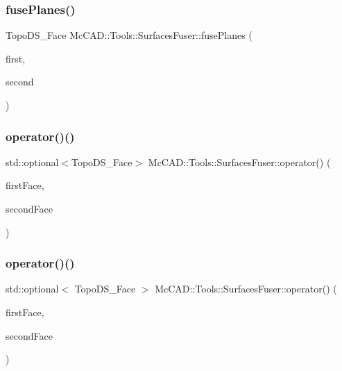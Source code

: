 \subsubsection{\texorpdfstring{fuse\+Planes()}{fusePlanes()}\hspace{0.1cm}{\footnotesize\ttfamily [2/2]}}
{\footnotesize\ttfamily Topo\+D\+S\+\_\+\+Face Mc\+C\+A\+D\+::\+Tools\+::\+Surfaces\+Fuser\+::fuse\+Planes (\begin{DoxyParamCaption}\item[{const Topo\+D\+S\+\_\+\+Face \&}]{first,  }\item[{const Topo\+D\+S\+\_\+\+Face \&}]{second }\end{DoxyParamCaption})\hspace{0.3cm}{\ttfamily [private]}}

\mbox{\label{classMcCAD_1_1Tools_1_1SurfacesFuser_a474383c6856eeb901ff8f947c8dca9ed}} 
\subsubsection{\texorpdfstring{operator()()}{operator()()}\hspace{0.1cm}{\footnotesize\ttfamily [1/2]}}
{\footnotesize\ttfamily std\+::optional$<$Topo\+D\+S\+\_\+\+Face$>$ Mc\+C\+A\+D\+::\+Tools\+::\+Surfaces\+Fuser\+::operator() (\begin{DoxyParamCaption}\item[{const Topo\+D\+S\+\_\+\+Face \&}]{first\+Face,  }\item[{const Topo\+D\+S\+\_\+\+Face \&}]{second\+Face }\end{DoxyParamCaption})}

\mbox{\label{classMcCAD_1_1Tools_1_1SurfacesFuser_a82a8e6526205fbfd22dbb93e01f24994}} 
\subsubsection{\texorpdfstring{operator()()}{operator()()}\hspace{0.1cm}{\footnotesize\ttfamily [2/2]}}
{\footnotesize\ttfamily std\+::optional$<$ Topo\+D\+S\+\_\+\+Face $>$ Mc\+C\+A\+D\+::\+Tools\+::\+Surfaces\+Fuser\+::operator() (\begin{DoxyParamCaption}\item[{const Topo\+D\+S\+\_\+\+Face \&}]{first\+Face,  }\item[{const Topo\+D\+S\+\_\+\+Face \&}]{second\+Face }\end{DoxyParamCaption})}



